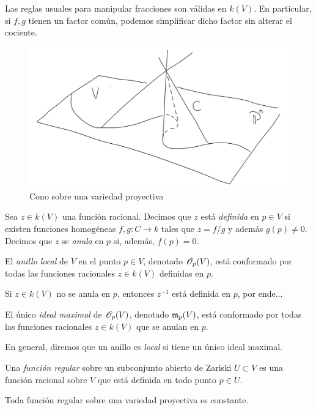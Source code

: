 \begin{remark}
Las reglas usuales para manipular fracciones son válidas en $k(V)$. En particular, si $f, g$ tienen un factor común, podemos simplificar dicho factor sin alterar el cociente.
\end{remark}

\begin{figure}[h]
    \centering
    \includegraphics[scale=0.3]{ch2/cone.png}
    \caption[Cono sobre una variedad proyectiva]{Cono sobre una variedad proyectiva \cite[p. 12]{hartshorne}}
\end{figure}

\begin{definition}
Sea $z \in k(V)$ una función racional. Decimos que $z$ está \textit{definida} en $p \in V$ si existen funciones homogéneas $f, g : C \to k$ tales que $z = f/g$ y además $g(p) \ne 0$. Decimos que $z$ se \textit{anula} en $p$ si, además, $f(p) = 0$.
\end{definition}

\begin{definition}
El \textit{anillo local} de $V$ en el punto $p \in V$, denotado $\mathscr O_p(V)$, está conformado por todas las funciones racionales $z \in k(V)$ definidas en $p$.
\end{definition}

\begin{remark}
Si $z \in k(V)$ no se anula en $p$, entonces $z^{-1}$ está definida en $p$, por ende...
\end{remark}

\begin{definition}
El único \textit{ideal maximal} de $\mathscr O_p(V)$, denotado $\mathfrak m_p(V)$, está conformado por todas las funciones racionales $z \in k(V)$ que se anulan en $p$.
\end{definition}

\begin{remark}
En general, diremos que un anillo es \textit{local} si tiene un único ideal maximal.
\end{remark}

\begin{definition}
Una \textit{función regular} sobre un subconjunto abierto de Zariski $U \subset V$ es una función racional sobre $V$ que está definida en todo punto $p \in U$.
\end{definition}

\begin{corollary}
Toda función regular sobre una variedad proyectiva es constante.
\end{corollary}
